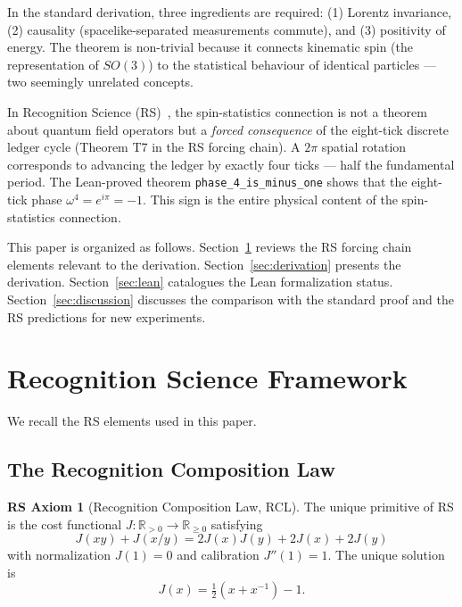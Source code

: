 \documentclass[12pt,a4paper]{article}
\theoremstyle{definition}
\newtheorem{axiom_rs}[theorem]{RS Axiom}
\theoremstyle{remark}
\begin{document}
In the standard derivation, three ingredients are required: (1) Lorentz
invariance, (2) causality (spacelike-separated measurements commute), and
(3) positivity of energy.  The theorem is non-trivial because it
connects kinematic spin (the representation of $SO(3)$) to the
statistical behaviour of identical particles — two seemingly unrelated
concepts.

In Recognition Science (RS)~\cite{Washburn2026a}, the spin-statistics
connection is not a theorem about quantum field operators but a
\emph{forced consequence} of the eight-tick discrete ledger cycle
(Theorem T7 in the RS forcing chain).  A $2\pi$ spatial rotation
corresponds to advancing the ledger by exactly four ticks — half the
fundamental period.  The Lean-proved theorem
\texttt{phase\_4\_is\_minus\_one} shows that the eight-tick phase
$\omega^4 = e^{i\pi} = -1$.  This sign is the entire physical content of
the spin-statistics connection.

This paper is organized as follows.  Section~\ref{sec:rs} reviews the
RS forcing chain elements relevant to the derivation.
Section~\ref{sec:derivation} presents the derivation.
Section~\ref{sec:lean} catalogues the Lean formalization status.
Section~\ref{sec:discussion} discusses the comparison with the standard
proof and the RS predictions for new experiments.

\section{Recognition Science Framework}
\label{sec:rs}

We recall the RS elements used in this paper.

\subsection{The Recognition Composition Law}

\begin{axiom_rs}[Recognition Composition Law, RCL]
The unique primitive of RS is the cost functional $J: \mathbb{R}_{>0}
\to \mathbb{R}_{\geq 0}$ satisfying
\begin{equation}
  J(xy) + J(x/y) = 2J(x)J(y) + 2J(x) + 2J(y)
  \label{eq:rcl}
\end{equation}
with normalization $J(1) = 0$ and calibration $J''(1) = 1$.  The unique
solution is
\begin{equation}
  J(x) = \tfrac{1}{2}(x + x^{-1}) - 1.
  \label{eq:J}
\end{equation}
\end{axiom_rs}
\end{document}
